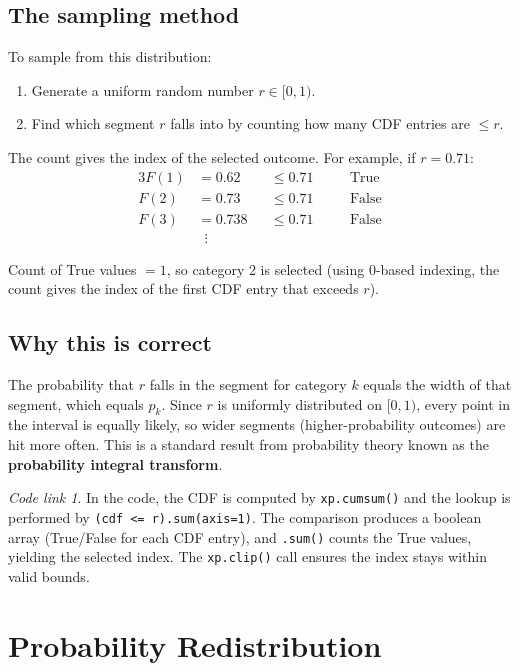 \documentclass[11pt,a4paper]{article}
\theoremstyle{remark}
\newtheorem*{codelink}{Code link}
\begin{document}
\subsection{The sampling method}

To sample from this distribution:
\begin{enumerate}[itemsep=4pt]
\item Generate a uniform random number $r \in [0, 1)$.
\item Find which segment $r$ falls into by counting how many CDF entries are $\leq r$.
\end{enumerate}

The count gives the index of the selected outcome. For example, if $r = 0.71$:
\begin{alignat*}{3}
F(1) &= 0.62  &&\leq 0.71 \quad &&\text{True} \\
F(2) &= 0.73  &&\leq 0.71 \quad &&\text{False} \\
F(3) &= 0.738 &&\leq 0.71 \quad &&\text{False} \\
     &\;\;\vdots && &&
\end{alignat*}

Count of True values $= 1$, so category 2 is selected (using 0-based indexing, the count gives the index of the first CDF entry that exceeds $r$).

\subsection{Why this is correct}

The probability that $r$ falls in the segment for category $k$ equals the width of that segment, which equals $p_k$. Since $r$ is uniformly distributed on $[0, 1)$, every point in the interval is equally likely, so wider segments (higher-probability outcomes) are hit more often. This is a standard result from probability theory known as the \textbf{probability integral transform}.

\begin{codelink}
In the code, the CDF is computed by \texttt{xp.cumsum()} and the lookup is performed by \texttt{(cdf <= r).sum(axis=1)}. The comparison produces a boolean array (True/False for each CDF entry), and \texttt{.sum()} counts the True values, yielding the selected index. The \texttt{xp.clip()} call ensures the index stays within valid bounds.
\end{codelink}

\section{Probability Redistribution}
\end{document}
